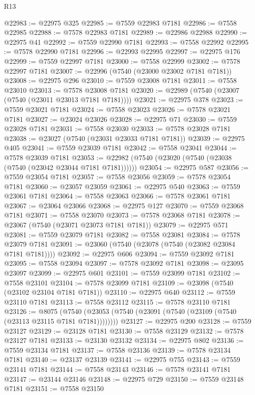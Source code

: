 \begin{lexlean}{R13}
\begin{coremodule}
@22983 := @22975 @325
@22985 := @7559 @22983 @7181
@22986 := @7558 @22985
@22988 := @7578 @22983 @7181
@22989 := @22986 @22988
@22990 := @22975 @41
@22992 := @7559 @22990 @7181
@22993 := @7558 @22992
@22995 := @7578 @22990 @7181
@22996 := @22993 @22995
@22997 := @22975 @176
@22999 := @7559 @22997 @7181
@23000 := @7558 @22999
@23002 := @7578 @22997 @7181
@23007 := @22996 (@7540 (@23000 @23002 @7181 @7181))
@23008 := @22975 @296
@23010 := @7559 @23008 @7181
@23011 := @7558 @23010
@23013 := @7578 @23008 @7181
@23020 := @22989 (@7540 (@23007 (@7540 (@23011 @23013 @7181 @7181))))
@23021 := @22975 @378
@23023 := @7559 @23021 @7181
@23024 := @7558 @23023
@23026 := @7578 @23021 @7181
@23027 := @23024 @23026
@23028 := @22975 @71
@23030 := @7559 @23028 @7181
@23031 := @7558 @23030
@23033 := @7578 @23028 @7181
@23038 := @23027 (@7540 (@23031 @23033 @7181 @7181))
@23039 := @22975 @405
@23041 := @7559 @23039 @7181
@23042 := @7558 @23041
@23044 := @7578 @23039 @7181
@23053 := @22982 (@7540 (@23020 (@7540 (@23038 (@7540 (@23042 @23044 @7181 @7181))))))
@23054 := @22975 @587
@23056 := @7559 @23054 @7181
@23057 := @7558 @23056
@23059 := @7578 @23054 @7181
@23060 := @23057 @23059
@23061 := @22975 @540
@23063 := @7559 @23061 @7181
@23064 := @7558 @23063
@23066 := @7578 @23061 @7181
@23067 := @23064 @23066
@23068 := @22975 @127
@23070 := @7559 @23068 @7181
@23071 := @7558 @23070
@23073 := @7578 @23068 @7181
@23078 := @23067 (@7540 (@23071 @23073 @7181 @7181))
@23079 := @22975 @571
@23081 := @7559 @23079 @7181
@23082 := @7558 @23081
@23084 := @7578 @23079 @7181
@23091 := @23060 (@7540 (@23078 (@7540 (@23082 @23084 @7181 @7181))))
@23092 := @22975 @606
@23094 := @7559 @23092 @7181
@23095 := @7558 @23094
@23097 := @7578 @23092 @7181
@23098 := @23095 @23097
@23099 := @22975 @601
@23101 := @7559 @23099 @7181
@23102 := @7558 @23101
@23104 := @7578 @23099 @7181
@23109 := @23098 (@7540 (@23102 @23104 @7181 @7181))
@23110 := @22975 @640
@23112 := @7559 @23110 @7181
@23113 := @7558 @23112
@23115 := @7578 @23110 @7181
@23126 := @8075
    (@7540 (@23053 (@7540 (@23091 (@7540 (@23109 (@7540 (@23113 @23115 @7181 @7181))))))))
@23127 := @22975 @200
@23128 := @7559 @23127
@23129 := @23128 @7181
@23130 := @7558 @23129
@23132 := @7578 @23127 @7181
@23133 := @23130 @23132
@23134 := @22975 @802
@23136 := @7559 @23134 @7181
@23137 := @7558 @23136
@23139 := @7578 @23134 @7181
@23140 := @23137 @23139
@23141 := @22975 @755
@23143 := @7559 @23141 @7181
@23144 := @7558 @23143
@23146 := @7578 @23141 @7181
@23147 := @23144 @23146
@23148 := @22975 @729
@23150 := @7559 @23148 @7181
@23151 := @7558 @23150

\end{coremodule}
\end{lexlean}
